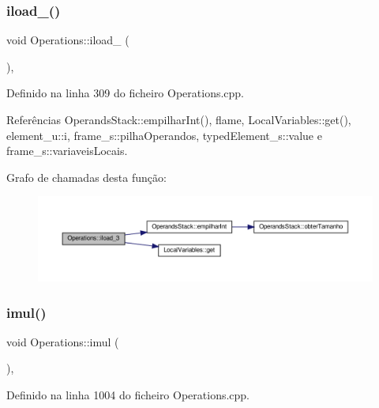 \subsubsection{\texorpdfstring{iload\+\_()}{iload\_3()}}
{\footnotesize\ttfamily void Operations\+::iload\+\_ (\begin{DoxyParamCaption}{ }\end{DoxyParamCaption})\hspace{0.3cm}{\ttfamily [static]}, {\ttfamily [private]}}



Definido na linha 309 do ficheiro Operations.\+cpp.



Referências Operands\+Stack\+::empilhar\+Int(), flame, Local\+Variables\+::get(), element\+\_\+u\+::i, frame\+\_\+s\+::pilha\+Operandos, typed\+Element\+\_\+s\+::value e frame\+\_\+s\+::variaveis\+Locais.

Grafo de chamadas desta função\+:
\nopagebreak
\begin{figure}[H]
\begin{center}
\leavevmode
\includegraphics[width=350pt]{classOperations_a3f645534291129289ee71c708dbe633c_cgraph}
\end{center}
\end{figure}
\mbox{\label{classOperations_a01b2ffdd380327b31b03657eb99b8a81}} 
\subsubsection{\texorpdfstring{imul()}{imul()}}
{\footnotesize\ttfamily void Operations\+::imul (\begin{DoxyParamCaption}{ }\end{DoxyParamCaption})\hspace{0.3cm}{\ttfamily [static]}, {\ttfamily [private]}}



Definido na linha 1004 do ficheiro Operations.\+cpp.



